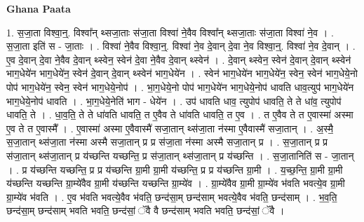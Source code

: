 \documentclass[17pt]{extarticle}
\begin{document}
\textbf{Ghana Paata } \newline

1. स॒जा॒ता विश्वा॒न्॒. विश्वा᳚न् थ्सजा॒ताः स॑जा॒ता विश्वा॑ ने॒वैव विश्वा᳚न् थ्सजा॒ताः स॑जा॒ता विश्वा॑ ने॒व । . स॒जा॒ता इति॑ स - जा॒ताः । . विश्वा॑ ने॒वैव विश्वा॒न्॒. विश्वा॑ ने॒व दे॒वान् दे॒वा ने॒व विश्वा॒न्॒. विश्वा॑ ने॒व दे॒वान् । . ए॒व दे॒वान् दे॒वा ने॒वैव दे॒वान् थ्स्वेन॒ स्वेन॑ दे॒वा ने॒वैव दे॒वान् थ्स्वेन॑ । . दे॒वान् थ्स्वेन॒ स्वेन॑ दे॒वान् दे॒वान् थ्स्वेन॑ भाग॒धेये॑न भाग॒धेये॑न॒ स्वेन॑ दे॒वान् दे॒वान् थ्स्वेन॑ भाग॒धेये॑न । . स्वेन॑ भाग॒धेये॑न भाग॒धेये॑न॒ स्वेन॒ स्वेन॑ भाग॒धेये॒नो पोप॑ भाग॒धेये॑न॒ स्वेन॒ स्वेन॑ भाग॒धेये॒नोप॑ । . भा॒ग॒धेये॒नो पोप॑ भाग॒धेये॑न भाग॒धेये॒नोप॑ धावति धाव॒त्युप॑ भाग॒धेये॑न भाग॒धेये॒नोप॑ धावति । . भा॒ग॒धेये॒नेति॑ भाग - धेये॑न । . उप॑ धावति धाव॒ त्युपोप॑ धावति॒ ते ते धा॑व॒ त्युपोप॑ धावति॒ ते । . धा॒व॒ति॒ ते ते धा॑वति धावति॒ त ए॒वैव ते धा॑वति धावति॒ त ए॒व । . त ए॒वैव ते त ए॒वास्मा॑ अस्मा ए॒व ते त ए॒वास्मै᳚ । . ए॒वास्मा॑ अस्मा ए॒वैवास्मै॑ सजा॒तान् थ्स॑जा॒ता न॑स्मा ए॒वैवास्मै॑ सजा॒तान् । . अ॒स्मै॒ स॒जा॒तान् थ्स॑जा॒ता न॑स्मा अस्मै सजा॒तान् प्र प्र स॑जा॒ता न॑स्मा अस्मै सजा॒तान् प्र । . स॒जा॒तान् प्र प्र स॑जा॒तान् थ्स॑जा॒तान् प्र य॑च्छन्ति यच्छन्ति॒ प्र स॑जा॒तान् थ्स॑जा॒तान् प्र य॑च्छन्ति । . स॒जा॒तानिति॑ स - जा॒तान् । . प्र य॑च्छन्ति यच्छन्ति॒ प्र प्र य॑च्छन्ति ग्रा॒मी ग्रा॒मी य॑च्छन्ति॒ प्र प्र य॑च्छन्ति ग्रा॒मी । . य॒च्छ॒न्ति॒ ग्रा॒मी ग्रा॒मी य॑च्छन्ति यच्छन्ति ग्रा॒म्ये॑वैव ग्रा॒मी य॑च्छन्ति यच्छन्ति ग्रा॒म्ये॑व । . ग्रा॒म्ये॑वैव ग्रा॒मी ग्रा॒म्ये॑व भ॑वति भवत्ये॒व ग्रा॒मी ग्रा॒म्ये॑व भ॑वति । . ए॒व भ॑वति भवत्ये॒वैव भ॑वति॒ छन्द॑सा॒म् छन्द॑साम् भवत्ये॒वैव भ॑वति॒ छन्द॑साम् । . भ॒व॒ति॒ छन्द॑सा॒म् छन्द॑साम् भवति भवति॒ छन्द॑सां॒ ॅवै वै छन्द॑साम् भवति भवति॒ छन्द॑सां॒ ॅवै । \newline
\end{document}
